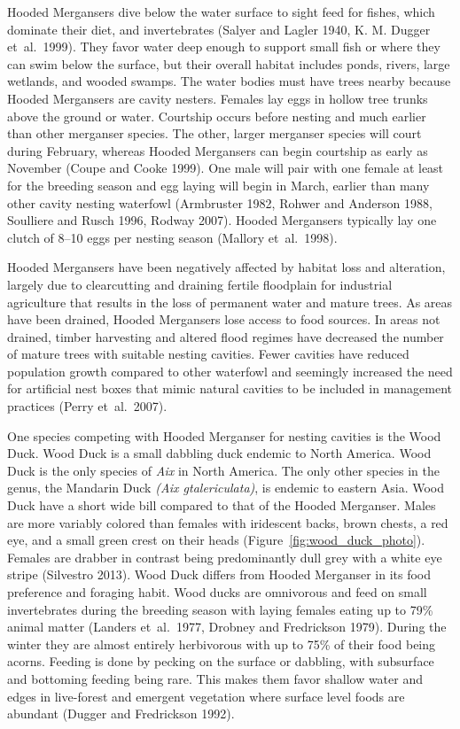  


Hooded Mergansers dive below the water surface to sight feed for fishes, which dominate their diet, and invertebrates (Salyer and Lagler 1940, K. M. Dugger et~al.~1999). They favor water deep enough to support small fish or where they can swim below the surface, but their overall habitat includes ponds, rivers, large wetlands, and wooded swamps. The water bodies must have trees nearby because Hooded Mergansers are cavity nesters. Females lay eggs in hollow tree trunks above the ground or water. Courtship occurs before nesting and much earlier than other merganser species. The other, larger merganser species will court during February, whereas Hooded Mergansers can begin courtship as early as November (Coupe and Cooke 1999). One male will pair with one female at least for the breeding season and egg laying will begin in March, earlier than many other cavity nesting waterfowl (Armbruster 1982, Rohwer and Anderson 1988, Soulliere and Rusch 1996, Rodway 2007). Hooded Mergansers typically lay one clutch of 8–10 eggs per nesting season (Mallory et~al.~1998).  

Hooded Mergansers have been negatively affected by habitat loss and alteration, largely due to clearcutting and draining fertile floodplain for industrial agriculture that results in the loss of permanent water and mature trees. As areas have been drained, Hooded Mergansers lose access to food sources. In areas not drained, timber harvesting and altered flood regimes have decreased the number of mature trees with suitable nesting cavities. Fewer cavities have reduced population growth compared to other waterfowl and seemingly increased the need for artificial nest boxes that mimic natural cavities to be included in management practices (Perry et~al.~2007).

One species competing with Hooded Merganser for nesting cavities is the Wood Duck.  Wood Duck is a small dabbling duck endemic to North America. Wood Duck is the only species of \textit{Aix} in North America. The only other species in the genus, the Mandarin Duck \textit{(Aix gtalericulata)}, is endemic to eastern Asia. Wood Duck have a short wide bill compared to that of the Hooded Merganser. Males are more variably colored than females with iridescent backs, brown chests, a red eye, and a small green crest on their heads (Figure~\ref{fig:wood_duck_photo}). Females are drabber in contrast being predominantly dull grey with a white eye stripe (Silvestro 2013). Wood Duck differs from Hooded Merganser in its food preference and foraging habit. Wood ducks are omnivorous and feed on small invertebrates during the breeding season with laying females eating up to 79\% animal matter (Landers et~al.~1977, Drobney and Fredrickson 1979). During the winter they are almost entirely herbivorous with up to 75\% of their food being acorns. Feeding is done by pecking on the surface or dabbling, with subsurface and bottoming feeding being rare. This makes them favor shallow water and edges in live-forest and emergent vegetation where surface level foods are abundant (Dugger and Fredrickson 1992).  

